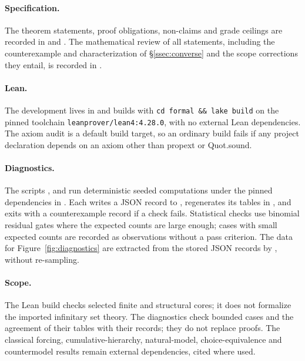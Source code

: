 \documentclass[11pt]{article}
\theoremstyle{definition}
\begin{document}
\paragraph{Specification.} The theorem statements, proof obligations, non-claims and grade
ceilings are recorded in  and
. The mathematical review of all statements, including the
counterexample and characterization of \S\ref{ssec:converse} and the scope corrections they
entail, is recorded in .

\paragraph{Lean.} The development lives in  and builds with \texttt{cd formal \&\&
lake build} on the pinned toolchain \texttt{leanprover/lean4:4.28.0}, with no external Lean
dependencies. The axiom audit  is a default build target, so an
ordinary build fails if any project declaration depends on an axiom other than
\textsf{propext} or \textsf{Quot.sound}.

\paragraph{Diagnostics.} The scripts ,
 and  run deterministic
seeded computations under the pinned dependencies in . Each
writes a JSON record to , regenerates its tables in
, and exits with a counterexample record if a check fails. Statistical
checks use binomial residual gates where the expected counts are large enough; cases with small
expected counts are recorded as observations without a pass criterion. The data for
Figure~\ref{fig:diagnostics} are extracted from the stored JSON records by
, without re-sampling.

\paragraph{Scope.} The Lean build checks selected finite and structural cores; it does not formalize
the imported infinitary set theory. The diagnostics check bounded cases and the agreement of their
tables with their records; they do not replace proofs. The classical forcing, cumulative-hierarchy,
natural-model, choice-equivalence and countermodel results remain external dependencies, cited
where used.
\end{document}
